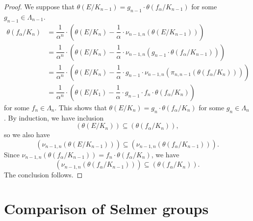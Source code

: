 \documentclass[11pt]{amsart}
\numberwithin{equation}{section}
\theoremstyle{definition}
\begin{document}
\begin{proof}
We suppose that
$\theta(E/K_{n-1}) = g_{n-1} \cdot \theta(f_\alpha/K_{n-1})$
for some $g_{n-1} \in \Lambda_{n-1}$.
\begin{align*}
\theta(f_\alpha/K_n) & = \dfrac{1}{\alpha^n} \cdot \left(  \theta(E/K_n) - \dfrac{1}{\alpha} \cdot \nu_{n-1, n}( \theta(E/K_{n-1}) )  \right) \\
& =  \dfrac{1}{\alpha^n} \cdot \left(  \theta(E/K_{n}) - \dfrac{1}{\alpha} \cdot \nu_{n-1, n}( g_{n-1} \cdot \theta(f_\alpha/K_{n-1}) )  \right) \\
& = \dfrac{1}{\alpha^n} \cdot \left(  \theta(E/K_n) - \dfrac{1}{\alpha} \cdot g_{n-1} \cdot \nu_{n-1, n}(  \pi_{n,n-1} ( \theta(f_\alpha/K_n)) )  \right) \\
& = \dfrac{1}{\alpha^n} \cdot \left(  \theta(E/K_1) - \dfrac{1}{\alpha} \cdot g_{n-1} \cdot f_{n} \cdot \theta(f_\alpha/K_n)   \right)
\end{align*}
for some $f_n \in \Lambda_n$.
 This shows that
$\theta(E/K_{n}) = g_{n} \cdot \theta(f_\alpha/K_{n})$
for some $g_{n} \in \Lambda_{n}$.
By induction, we have inclusion
$$(\theta(E/K_n)) \subseteq (\theta(f_\alpha/K_n)),$$
so we also have
$$( \nu_{n-1, n} \left( \theta(E/K_{n-1}) \right) ) \subseteq ( \nu_{n-1, n} \left( \theta(f_\alpha/K_{n-1}) \right)).$$
Since $\nu_{n-1, n} \left( \theta(f_\alpha/K_{n-1}) \right) = f_{n} \cdot \theta(f_\alpha/K_n)$, we have
$$( \nu_{n-1, n} \left( \theta(f_\alpha/K_{n-1}) \right)) \subseteq ( \theta(f_\alpha/K_{n}) ).$$
The conclusion follows.
\end{proof}

 

\section{Comparison of Selmer groups}
\end{document}
